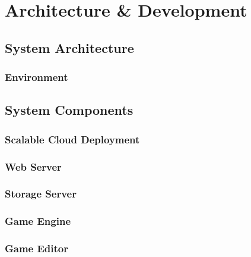 \chapter{Architecture \& Development}
\section{System Architecture}
	\subsection{Environment}


\section{System Components}
% 
	\subsection{Scalable Cloud Deployment}
	\subsection{Web Server}
	\subsection{Storage Server}
	\subsection{Game Engine}
	\subsection{Game Editor}

